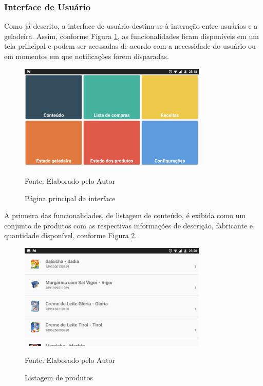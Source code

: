 \ProximoForaDoSumario 
\subsubsection{Interface de Usuário}

Como já descrito, a interface de usuário destina-se à interação entre usuários e a geladeira. Assim, conforme Figura \ref{fig:cap3_app_mainpage}, as funcionalidades ficam disponíveis em um tela principal e podem ser acessadas de acordo com a necessidade do usuário ou em momentos em que notificações forem disparadas.

\begin{figure}[htb]
    \caption{Página principal da interface}
    \label{fig:cap3_app_mainpage}
    \includegraphics[width=0.8\textwidth]{figuras/cap4_app_mainpage.png}
    
    \footnotesize{Fonte: Elaborado pelo Autor}
\end{figure}

A primeira das funcionalidades, de listagem de conteúdo, é exibida como um conjunto de produtos com as respectivas informações de descrição, fabricante e quantidade disponível, conforme Figura \ref{fig:cap4_listagem_de_produtos}.

\begin{figure}[htb]
    \caption{Listagem de produtos}
    \label{fig:cap4_listagem_de_produtos}
    \includegraphics[width=0.8\textwidth]{figuras/cap4_listagem_de_produtos.png}
    
    \footnotesize{Fonte: Elaborado pelo Autor}
\end{figure}

